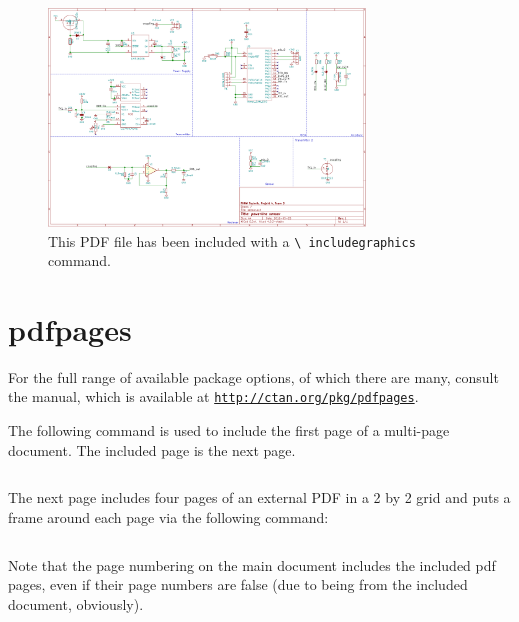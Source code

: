 \documentclass[a4paper,oneside]{article}
\newcommand\code[1]{\texttt{#1}}
\begin{document}
\begin{figure}[h!]
    \centering
    \includegraphics[width=0.75\textwidth]{includes/a4.pdf}
    \caption{%
        This  PDF   file  has   been  included  with   a  \code{\textbackslash
        includegraphics} command.}
    \label{fig:includegraphics}
\end{figure}


\clearpage
\section{pdfpages}
\label{sec:pdfpages}

For   the    full   range   of    available   package   options,    of   which
there   are    many,   consult   the    manual,   which   is    available   at
\href{http://ctan.org/pkg/pdfpages}{\nolinkurl{http://ctan.org/pkg/pdfpages}}.

The  following command  is used  to  include the  first page  of a  multi-page
document.  The included page is the next page.

\begin{verbatim}

\end{verbatim}



The next page includes four pages of an external PDF in a 2 by 2 grid and puts
a frame around each page via the following command:

\begin{verbatim}

\end{verbatim}

Note that  the page numbering on  the main document includes  the included pdf
pages, even if  their page numbers are  false (due to being  from the included
document, obviously).
\end{document}

